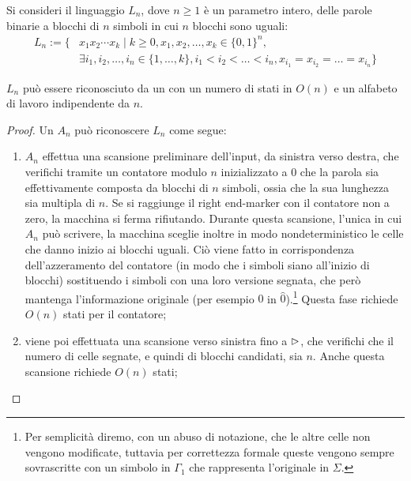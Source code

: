 Si consideri il linguaggio $L_n$, dove $n\geq1$ è un parametro intero, delle parole binarie a blocchi di $n$ simboli in cui $n$ blocchi sono uguali:
\begin{align*}
	L_n := \{ & x_1x_2\cdots x_k\mid k\geq0, x_1,x_2,\dots,x_k\in\{0,1\}^n,                                   \\
	          & \exists i_1,i_2,\dots,i_n\in\{1,\dots,k\},i_1<i_2<\dots<i_n, x_{i_1}=x_{i_2}=\dots=x_{i_n}\}
\end{align*}

\begin{theor}
	$L_n$ può essere riconosciuto da un  con un numero di stati in $O(n)$ e un alfabeto di lavoro indipendente da $n$.
\end{theor}
\begin{proof}
	Un  $A_n$ può riconoscere $L_n$ come segue:
	\begin{enumerate}
	\item $A_n$ effettua una scansione preliminare dell'input, da sinistra verso destra, che verifichi tramite un contatore modulo $n$ inizializzato a $0$ che la parola sia effettivamente composta da blocchi di $n$ simboli, ossia che la sua lunghezza sia multipla di $n$. Se si raggiunge il right end-marker con il contatore non a zero, la macchina si ferma rifiutando. Durante questa scansione, l'unica in cui $A_n$ può scrivere, la macchina sceglie inoltre in modo nondeterministico le celle che danno inizio ai blocchi uguali. Ciò viene fatto in corrispondenza dell'azzeramento del contatore (in modo che i simboli siano all'inizio di blocchi) sostituendo i simboli con una loro versione segnata, che però mantenga l'informazione originale (per esempio $0$ in $\hat 0$).\footnote{Per semplicità diremo, con un abuso di notazione, che le altre celle non vengono modificate, tuttavia per correttezza formale queste vengono sempre sovrascritte con un simbolo in $\Gamma_1$ che rappresenta l'originale in $\Sigma$.} Questa fase richiede $O(n)$ stati per il contatore;
		\item viene poi effettuata una scansione verso sinistra fino a $\rhd$, che verifichi che il numero di celle segnate, e quindi di blocchi candidati, sia $n$. Anche questa scansione richiede $O(n)$ stati;

\end{enumerate}
\end{proof}
